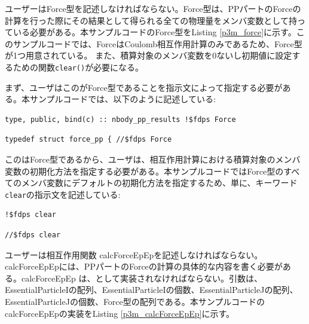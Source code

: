 ユーザーはForce型を記述しなければならない。Force型は、PPパートのForceの計算を行った際にその結果として得られる全ての物理量をメンバ変数として持っている必要がある。本サンプルコードのForce型をListing \ref{p3m_force}に示す。このサンプルコードでは、ForceはCoulomb相互作用計算のみであるため、Force型が1つ用意されている。
\ifCpp %
また、積算対象のメンバ変数を0ないし初期値に設定するための関数\texttt{clear()}が必要になる。
\endifCpp

\ifCpp %

\endifCpp
\ifFtn %

\endifFtn
\ifC %

\endifC

\ifIF %
まず、ユーザはこの\structure がForce型であることを指示文によって指定する必要がある。本サンプルコードでは、以下のように記述している:
\endifIF
\ifFtn %
\begin{screen}
\begin{verbatim}
type, public, bind(c) :: nbody_pp_results !$fdps Force
\end{verbatim}
\end{screen}
\endifFtn
\ifC %
\begin{screen}
\begin{verbatim}
typedef struct force_pp { //$fdps Force
\end{verbatim}
\end{screen}
\endifC
\ifIF %
この\structure はForce型であるから、ユーザは、相互作用計算における積算対象のメンバ変数の初期化方法を指定する必要がある。本サンプルコードではForce型のすべてのメンバ変数にデフォルトの初期化方法を指定するため、単に、キーワード\texttt{clear}の指示文を記述している:
\endifIF
\ifFtn %
\begin{screen}
\begin{verbatim}
!$fdps clear
\end{verbatim}
\end{screen}
\endifFtn
\ifC %
\begin{screen}
\begin{verbatim}
//$fdps clear
\end{verbatim}
\end{screen}
\endifC

 \label{subsubsubsec:p3m_calcForceEpEp}
ユーザーは相互作用関数 calcForceEpEpを記述しなければならない。calcForceEpEpには、PPパートのForceの計算の具体的な内容を書く必要がある。calcForceEpEp は、\procedure {}として実装されなければならない。引数は、EssentialParticleIの配列、EssentialParticleIの個数、EssentialParticleJの配列、EssentialParticleJの個数、Force型の配列である。本サンプルコードのcalcForceEpEpの実装をListing \ref{p3m_calcForceEpEp}に示す。

